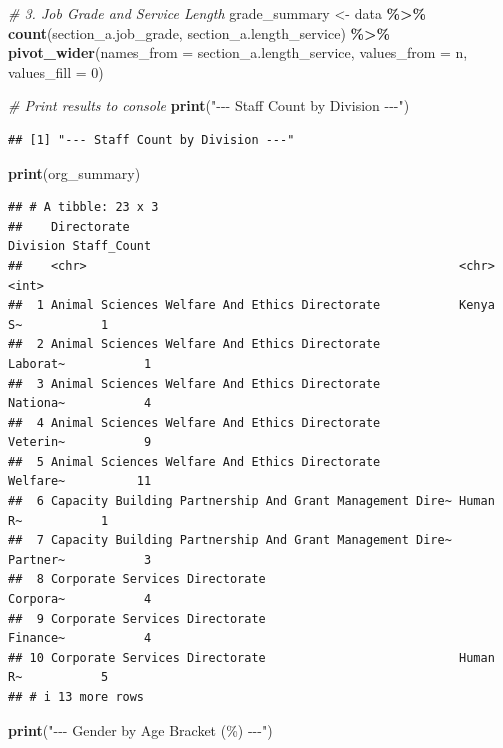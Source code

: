 \documentclass[
]{article}
\newenvironment{Shaded}{\begin{snugshade}}{\end{snugshade}}
\newcommand{\AttributeTok}[1]{\textcolor[rgb]{0.13,0.29,0.53}{#1}}
\newcommand{\CommentTok}[1]{\textcolor[rgb]{0.56,0.35,0.01}{\textit{#1}}}
\newcommand{\DecValTok}[1]{\textcolor[rgb]{0.00,0.00,0.81}{#1}}
\newcommand{\FunctionTok}[1]{\textcolor[rgb]{0.13,0.29,0.53}{\textbf{#1}}}
\newcommand{\NormalTok}[1]{#1}
\newcommand{\OtherTok}[1]{\textcolor[rgb]{0.56,0.35,0.01}{#1}}
\newcommand{\SpecialCharTok}[1]{\textcolor[rgb]{0.81,0.36,0.00}{\textbf{#1}}}
\newcommand{\StringTok}[1]{\textcolor[rgb]{0.31,0.60,0.02}{#1}}
\begin{document}
\begin{Shaded}
\begin{Highlighting}[]
\CommentTok{\# 3. Job Grade and Service Length}
\NormalTok{grade\_summary }\OtherTok{\textless{}{-}}\NormalTok{ data }\SpecialCharTok{\%\textgreater{}\%}
  \FunctionTok{count}\NormalTok{(section\_a.job\_grade, section\_a.length\_service) }\SpecialCharTok{\%\textgreater{}\%}
  \FunctionTok{pivot\_wider}\NormalTok{(}\AttributeTok{names\_from =}\NormalTok{ section\_a.length\_service, }\AttributeTok{values\_from =}\NormalTok{ n, }\AttributeTok{values\_fill =} \DecValTok{0}\NormalTok{)}

\CommentTok{\# Print results to console}
\FunctionTok{print}\NormalTok{(}\StringTok{"{-}{-}{-} Staff Count by Division {-}{-}{-}"}\NormalTok{)}
\end{Highlighting}
\end{Shaded}

\begin{verbatim}
## [1] "--- Staff Count by Division ---"
\end{verbatim}

\begin{Shaded}
\begin{Highlighting}[]
\FunctionTok{print}\NormalTok{(org\_summary)}
\end{Highlighting}
\end{Shaded}

\begin{verbatim}
## # A tibble: 23 x 3
##    Directorate                                              Division Staff_Count
##    <chr>                                                    <chr>          <int>
##  1 Animal Sciences Welfare And Ethics Directorate           Kenya S~           1
##  2 Animal Sciences Welfare And Ethics Directorate           Laborat~           1
##  3 Animal Sciences Welfare And Ethics Directorate           Nationa~           4
##  4 Animal Sciences Welfare And Ethics Directorate           Veterin~           9
##  5 Animal Sciences Welfare And Ethics Directorate           Welfare~          11
##  6 Capacity Building Partnership And Grant Management Dire~ Human R~           1
##  7 Capacity Building Partnership And Grant Management Dire~ Partner~           3
##  8 Corporate Services Directorate                           Corpora~           4
##  9 Corporate Services Directorate                           Finance~           4
## 10 Corporate Services Directorate                           Human R~           5
## # i 13 more rows
\end{verbatim}

\begin{Shaded}
\begin{Highlighting}[]
\FunctionTok{print}\NormalTok{(}\StringTok{"{-}{-}{-} Gender by Age Bracket (\%) {-}{-}{-}"}\NormalTok{)}
\end{Highlighting}
\end{Shaded}
\end{document}
